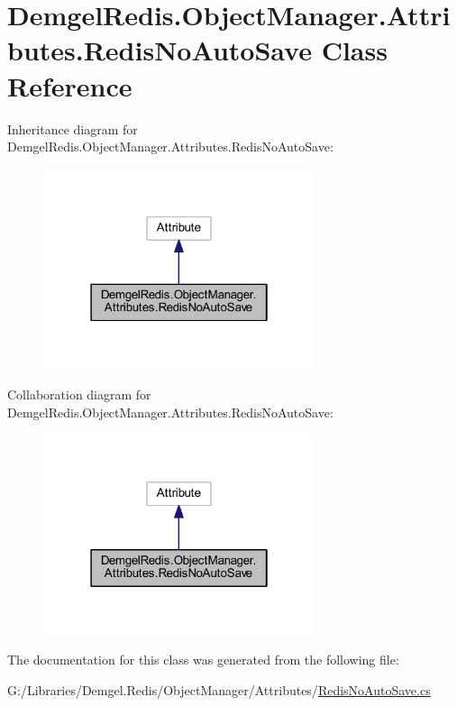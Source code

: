 \hypertarget{class_demgel_redis_1_1_object_manager_1_1_attributes_1_1_redis_no_auto_save}{}\section{Demgel\+Redis.\+Object\+Manager.\+Attributes.\+Redis\+No\+Auto\+Save Class Reference}
\label{class_demgel_redis_1_1_object_manager_1_1_attributes_1_1_redis_no_auto_save}


Inheritance diagram for Demgel\+Redis.\+Object\+Manager.\+Attributes.\+Redis\+No\+Auto\+Save\+:
\nopagebreak
\begin{figure}[H]
\begin{center}
\leavevmode
\includegraphics[width=226pt]{class_demgel_redis_1_1_object_manager_1_1_attributes_1_1_redis_no_auto_save__inherit__graph}
\end{center}
\end{figure}


Collaboration diagram for Demgel\+Redis.\+Object\+Manager.\+Attributes.\+Redis\+No\+Auto\+Save\+:
\nopagebreak
\begin{figure}[H]
\begin{center}
\leavevmode
\includegraphics[width=226pt]{class_demgel_redis_1_1_object_manager_1_1_attributes_1_1_redis_no_auto_save__coll__graph}
\end{center}
\end{figure}


The documentation for this class was generated from the following file\+:\begin{DoxyCompactItemize}
\item 
G\+:/\+Libraries/\+Demgel.\+Redis/\+Object\+Manager/\+Attributes/\hyperlink{_redis_no_auto_save_8cs}{Redis\+No\+Auto\+Save.\+cs}\end{DoxyCompactItemize}
